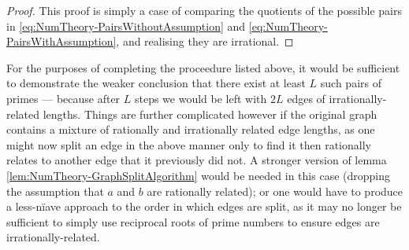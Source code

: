 \begin{proof}
    This proof is simply a case of comparing the quotients of the possible pairs in \eqref{eq:NumTheory-PairsWithoutAssumption} and \eqref{eq:NumTheory-PairsWithAssumption}, and realising they are irrational.
\end{proof}
For the purposes of completing the proceedure listed above, it would be sufficient to demonstrate the weaker conclusion that there exist at least $L$ such pairs of primes --- because after $L$ steps we would be left with $2L$ edges of irrationally-related lengths.
Things are further complicated however if the original graph contains a mixture of rationally and irrationally related edge lengths, as one might now split an edge in the above manner only to find it then rationally relates to another edge that it previously did not.
A stronger version of lemma \ref{lem:NumTheory-GraphSplitAlgorithm} would be needed in this case (dropping the assumption that $a$ and $b$ are rationally related); or one would have to produce a less-n\"{i}ave approach to the order in which edges are split, as it may no longer be sufficient to simply use reciprocal roots of prime numbers to ensure edges are irrationally-related.

